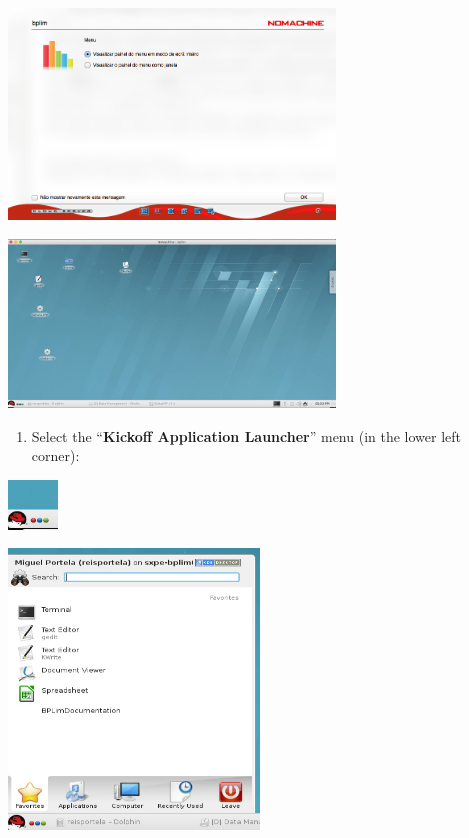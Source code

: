 \documentclass[
  11pt,
  a4paper,
]{article}
\providecommand{\tightlist}{%
  \setlength{\itemsep}{0pt}\setlength{\parskip}{0pt}}
\begin{document}
\includegraphics[width=0.65\textwidth,height=\textheight]{./media/image2.png}

\includegraphics[width=0.65\textwidth,height=\textheight]{./media/image3.png}

\begin{enumerate}
\def\labelenumi{\arabic{enumi}.}
\setcounter{enumi}{3}
\tightlist
\item
  Select the ``\textbf{Kickoff Application Launcher}'' menu (in the
  lower left corner):
\end{enumerate}

\includegraphics[width=0.1\textwidth,height=\textheight]{./media/image4.png}

\includegraphics[width=0.5\textwidth,height=\textheight]{./media/image5.png}
\end{document}
